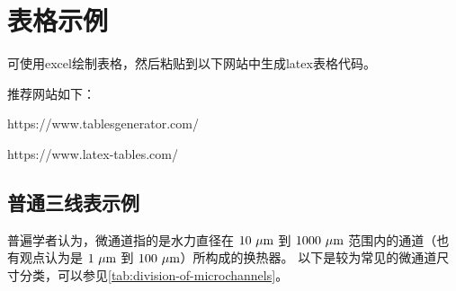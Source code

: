 \chapter{表格示例}\label{ch:2}

可使用excel绘制表格，然后粘贴到以下网站中生成latex表格代码。

推荐网站如下：

https://www.tablesgenerator.com/

https://www.latex-tables.com/

\section{普通三线表示例}
普遍学者认为，微通道指的是水力直径在 $10\ \rm{\mu m}$ 到 $1000\ \rm{\mu m}$ 范围内的通道（也有观点认为是 $1\ \rm{\mu m}$ 到 $100\ \rm{\mu m}$）所构成的换热器。
以下是较为常见的微通道尺寸分类，可以参见\cref{tab:division-of-microchannels}。
\begin{table}[htbp]
    \caption[微通道的划分]{微通道的划分\cite{LuSiHong_2021}}
    \label{tab:division-of-microchannels}
\end{table}



